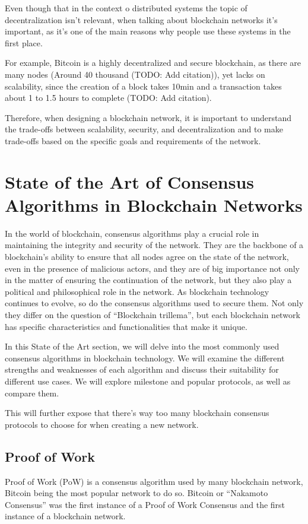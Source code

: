 Even though that in the context o distributed systems the topic of decentralization isn't relevant, when talking about blockchain networks it's important, as it's one of the main reasons why people use these systems in the first place.

For example, Bitcoin is a highly decentralized and secure blockchain, as there are many nodes (Around 40 thousand (TODO: Add citation)), yet lacks on scalability, since the creation of a block takes 10min and a transaction takes about 1 to 1.5 hours to complete (TODO: Add citation).

Therefore, when designing a blockchain network, it is important to understand the trade-offs between scalability, security, and decentralization and to make trade-offs based on the specific goals and requirements of the network.



\section{State of the Art of Consensus Algorithms in Blockchain Networks}

In the world of blockchain, consensus algorithms play a crucial role in maintaining the integrity and security of the network. They are the backbone of a blockchain's ability to ensure that all nodes agree on the state of the network, even in the presence of malicious actors, and they are of big importance not only in the matter of ensuring the continuation of the network, but they also play a political and philosophical role in the network.
As blockchain technology continues to evolve, so do the consensus algorithms used to secure them.
Not only they differ on the question of ``Blockchain trillema'', but each blockchain network has specific characteristics and functionalities that make it unique.

In this State of the Art section, we will delve into the most commonly used consensus algorithms in blockchain technology. We will examine the different strengths and weaknesses of each algorithm and discuss their suitability for different use cases. We will explore milestone and popular protocols, as well as compare them.

This will further expose that there's way too many blockchain consensus protocols to choose for when creating a new network.


\subsection*{\textbf{Proof of Work}}
Proof of Work (PoW) is a consensus algorithm used by many blockchain network, Bitcoin being the most popular network to do so.
Bitcoin or ``Nakamoto Consensus'' was the first instance of a Proof of Work Consensus and the first instance of a blockchain network.

